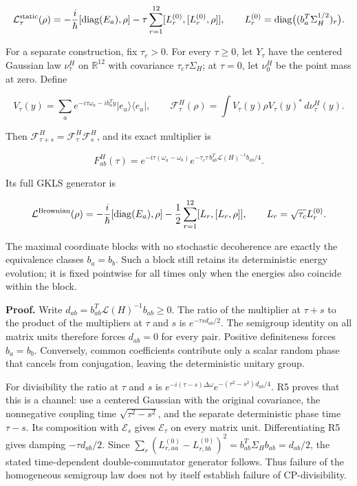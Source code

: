 \documentclass[
  11pt,
]{article}
\begin{document}
\[
\mathcal L^{\rm static}_\tau(\rho)
=-\frac{i}{\hbar}[\operatorname{diag}(E_a),\rho]
-\tau\sum_{r=1}^{12}[L^{(0)}_r,[L^{(0)}_r,\rho]],
\qquad
L^{(0)}_r=\operatorname{diag}\bigl((b_a^T\Sigma_H^{1/2})_r\bigr).
\]

For a separate construction, fix \(\tau_c>0\). For every \(\tau\ge0\),
let \(Y_\tau\) have the centered Gaussian law \(\nu^H_\tau\) on
\(\mathbb R^{12}\) with covariance \(\tau_c\tau\Sigma_H\); at
\(\tau=0\), let \(\nu^H_0\) be the point mass at zero. Define

\[
V_\tau(y)=\sum_a e^{-i\tau\omega_a-i b_a^Ty}|e_a\rangle\langle e_a|,
\qquad
\mathcal F^H_\tau(\rho)=\int V_\tau(y)\rho V_\tau(y)^*\,d\nu^H_\tau(y).
\]

Then \(\mathcal F^H_{\tau+s}=\mathcal F^H_\tau\mathcal F^H_s\), and its
exact multiplier is

\[
F^H_{ab}(\tau)=e^{-i\tau(\omega_a-\omega_b)}
e^{-\tau_c\tau\,b_{ab}^T\mathscr L(H)^{-1}b_{ab}/4}.
\]

Its full GKLS generator is

\[
\mathcal L^{\rm Brownian}(\rho)
=-\frac{i}{\hbar}[\operatorname{diag}(E_a),\rho]
-\frac12\sum_{r=1}^{12}[L_r,[L_r,\rho]],
\qquad L_r=\sqrt{\tau_c}L^{(0)}_r.
\]

The maximal coordinate blocks with no stochastic decoherence are exactly
the equivalence classes \(b_a=b_b\). Such a block still retains its
deterministic energy evolution; it is fixed pointwise for all times only
when the energies also coincide within the block.

\textbf{Proof.} Write \(d_{ab}=b_{ab}^T\mathscr L(H)^{-1}b_{ab}\ge0\).
The ratio of the multiplier at \(\tau+s\) to the product of the
multipliers at \(\tau\) and \(s\) is \(e^{-\tau s d_{ab}/2}\). The
semigroup identity on all matrix units therefore forces \(d_{ab}=0\) for
every pair. Positive definiteness forces \(b_a=b_b\). Conversely, common
coefficients contribute only a scalar random phase that cancels from
conjugation, leaving the deterministic unitary group.

For divisibility the ratio at \(\tau\) and \(s\) is
\(e^{-i(\tau-s)\Delta\omega}e^{-(\tau^2-s^2)d_{ab}/4}\). R5 proves that
this is a channel: use a centered Gaussian with the original covariance,
the nonnegative coupling time \(\sqrt{\tau^2-s^2}\), and the separate
deterministic phase time \(\tau-s\). Its composition with
\(\mathcal E_s\) gives \(\mathcal E_\tau\) on every matrix unit.
Differentiating R5 gives damping \(-\tau d_{ab}/2\). Since
\(\sum_r(L^{(0)}_{r,aa}-L^{(0)}_{r,bb})^2=b_{ab}^T\Sigma_Hb_{ab}=d_{ab}/2\),
the stated time-dependent double-commutator generator follows. Thus
failure of the homogeneous semigroup law does not by itself establish
failure of CP-divisibility.
\end{document}
